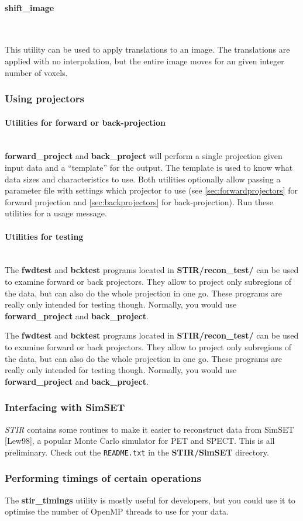 \documentclass{article}
\newcommand{\subsubsubsection}[1]{\paragraph{#1}\mbox{} \\}
\begin{document}
{{{ \subsubsubsection{shift\_image}
}
This utility can be used to
apply translations to an image. The translations are applied with no
interpolation, but the entire image moves for an given integer number of
voxels. 

\subsubsection{
Using projectors}

\subsubsubsection{
Utilities for forward or back-projection}
\textbf{forward\_project} and \textbf{back\_project} will perform a single projection given
input data and a ``template'' for the output. The template is used to know what data sizes and
characteristics to use. Both utilities optionally allow passing a parameter file with settings
which projector to use (see \ref{sec:forwardprojectors} for forward projection
and \ref{sec:backprojectors} for back-projection).
Run these utilities for a usage message.

\subsubsubsection{Utilities for testing}
The \textbf{fwdtest} and \textbf{bcktest} programs located in \textbf{STIR/recon\_test/} can 
be used to examine forward or back projectors. They allow to 
project only subregions of the data, but can also do the whole 
projection in one go. These programs are really only intended for testing though.
Normally, you would use \textbf{forward\_project} and \textbf{back\_project}.

The \textbf{fwdtest} and \textbf{bcktest} programs located in \textbf{STIR/recon\_test/} can 
be used to examine forward or back projectors. They allow to 
project only subregions of the data, but can also do the whole 
projection in one go. These programs are really only intended for testing though.
Normally, you would use \textbf{forward\_project} and \textbf{back\_project}.


\subsubsection{
Interfacing with SimSET}
\textit{STIR} contains some routines to make it easier to reconstruct data from SimSET [Lew98], 
a popular Monte Carlo simulator for PET and SPECT. This
is all preliminary. Check out the \texttt{README.txt} in the \textbf{STIR/SimSET} directory.

\subsubsection{
Performing timings of certain operations}
The \textbf{stir\_timings} utility  is mostly useful for developers,
but you could use it to optimise the number of OpenMP threads to use for your data.

}}
\end{document}
